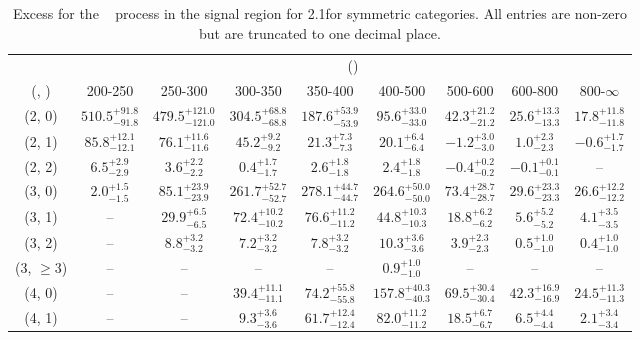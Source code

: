 \begin{table}[h!]
\tiny
\centering
\caption{Excess for the \zInv~ process in the signal region for 2.1\ifb for symmetric categories. All entries are non-zero but are truncated to one decimal place.\label{tab:excesssep_sig_zinv_sym}}
\begin{tabular}
{ccccccccc}
	\hline\hline
	& \multicolumn{8}{c}{\scalht (\gev)} \\ 
	 (\njet,  \nb) & 200-250 & 250-300 & 300-350 & 350-400 & 400-500 & 500-600 & 600-800 & 800-$\infty$ \\ [0.8ex] 
\hline
	(2, 0) & $510.5^{+ 91.8 }_{- 91.8 }$ & $479.5^{+ 121.0 }_{- 121.0 }$ & $304.5^{+ 68.8 }_{- 68.8 }$ & $187.6^{+ 53.9 }_{- 53.9 }$ & $95.6^{+ 33.0 }_{- 33.0 }$ & $42.3^{+ 21.2 }_{- 21.2 }$ & $25.6^{+ 13.3 }_{- 13.3 }$ & $17.8^{+ 11.8 }_{- 11.8 }$ \\[0.5ex] 
	(2, 1) & $85.8^{+ 12.1 }_{- 12.1 }$ & $76.1^{+ 11.6 }_{- 11.6 }$ & $45.2^{+ 9.2 }_{- 9.2 }$ & $21.3^{+ 7.3 }_{- 7.3 }$ & $20.1^{+ 6.4 }_{- 6.4 }$ & $-1.2^{+ 3.0 }_{- 3.0 }$ & $1.0^{+ 2.3 }_{- 2.3 }$ & $-0.6^{+ 1.7 }_{- 1.7 }$ \\[0.5ex] 
	(2, 2) & $6.5^{+ 2.9 }_{- 2.9 }$ & $3.6^{+ 2.2 }_{- 2.2 }$ & $0.4^{+ 1.7 }_{- 1.7 }$ & $2.6^{+ 1.8 }_{- 1.8 }$ & $2.4^{+ 1.8 }_{- 1.8 }$ & $-0.4^{+ 0.2 }_{- 0.2 }$ & $-0.1^{+ 0.1 }_{- 0.1 }$ & -- \\[0.5ex] 
	(3, 0) & $2.0^{+ 1.5 }_{- 1.5 }$ & $85.1^{+ 23.9 }_{- 23.9 }$ & $261.7^{+ 52.7 }_{- 52.7 }$ & $278.1^{+ 44.7 }_{- 44.7 }$ & $264.6^{+ 50.0 }_{- 50.0 }$ & $73.4^{+ 28.7 }_{- 28.7 }$ & $29.6^{+ 23.3 }_{- 23.3 }$ & $26.6^{+ 12.2 }_{- 12.2 }$ \\[0.5ex] 
	(3, 1) & -- & $29.9^{+ 6.5 }_{- 6.5 }$ & $72.4^{+ 10.2 }_{- 10.2 }$ & $76.6^{+ 11.2 }_{- 11.2 }$ & $44.8^{+ 10.3 }_{- 10.3 }$ & $18.8^{+ 6.2 }_{- 6.2 }$ & $5.6^{+ 5.2 }_{- 5.2 }$ & $4.1^{+ 3.5 }_{- 3.5 }$ \\[0.5ex] 
	(3, 2) & -- & $8.8^{+ 3.2 }_{- 3.2 }$ & $7.2^{+ 3.2 }_{- 3.2 }$ & $7.8^{+ 3.2 }_{- 3.2 }$ & $10.3^{+ 3.6 }_{- 3.6 }$ & $3.9^{+ 2.3 }_{- 2.3 }$ & $0.5^{+ 1.0 }_{- 1.0 }$ & $0.4^{+ 1.0 }_{- 1.0 }$ \\[0.5ex] 
	(3, $\ge3$) & -- & -- & -- & -- & $0.9^{+ 1.0 }_{- 1.0 }$ & -- & -- & -- \\[0.5ex] 
	(4, 0) & -- & -- & $39.4^{+ 11.1 }_{- 11.1 }$ & $74.2^{+ 55.8 }_{- 55.8 }$ & $157.8^{+ 40.3 }_{- 40.3 }$ & $69.5^{+ 30.4 }_{- 30.4 }$ & $42.3^{+ 16.9 }_{- 16.9 }$ & $24.5^{+ 11.3 }_{- 11.3 }$ \\[0.5ex] 
	(4, 1) & -- & -- & $9.3^{+ 3.6 }_{- 3.6 }$ & $61.7^{+ 12.4 }_{- 12.4 }$ & $82.0^{+ 11.2 }_{- 11.2 }$ & $18.5^{+ 6.7 }_{- 6.7 }$ & $6.5^{+ 4.4 }_{- 4.4 }$ & $2.1^{+ 3.4 }_{- 3.4 }$ \\[0.5ex] 

\end{tabular}
\end{table}
